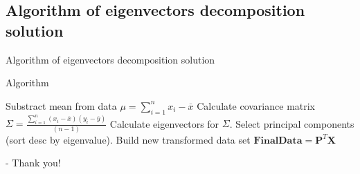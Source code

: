 \documentclass[xcolor=x11names,compress,10pt]{beamer}
\renewcommand{\(}{\begin{columns}}
\renewcommand{\)}{\end{columns}}
\newcommand{\<}[1]{\begin{column}{#1}}
\renewcommand{\>}{\end{column}}
\begin{document}
\subsection{Algorithm of eigenvectors decomposition solution}
\begin{frame}{Algorithm of eigenvectors decomposition solution}
\begin{block}{Algorithm}
\begin{algorithmic}[1] 
	\STATE Substract mean from data $\mu = \sum_{i=1}^n x_i - \overline{x}$
	\STATE Calculate covariance matrix $\Sigma = \frac{\sum_{i=1}^n (x_i - \overline{x})(y_i - \overline{y})}{(n-1)}$
\STATE Calculate eigenvectors for $\Sigma$.
\STATE Select principal components (sort desc by eigenvalue).
\STATE Build new transformed data set $\mathbf{FinalData} = \textbf{P}^T \textbf{X}$
\end{algorithmic} 
\end{block}
\end{frame}


\begin{frame}
\begin{block}{-}
Thank you!
\end{block}
\end{frame}
\end{document}
